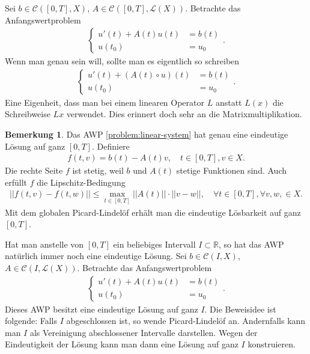 \documentclass[a4paper]{article}
\theoremstyle{definition}
\newtheorem{remark}[theorem]{Bemerkung}
\begin{document}
Sei $b \in \mathcal{C}([0,T], X)$, $A \in \mathcal C([0,T], \mathcal{L}(X))$. Betrachte das Anfangswertproblem
\begin{align}\label{problem:linear-system}
    \begin{cases}
        u'(t) + A(t)u(t) &= b(t) \\
        u(t_0) &= u_0
    \end{cases} \tag{$\star$}.
\end{align}
Wenn man genau sein will, sollte man es eigentlich so schreiben
\begin{align*}
    \begin{cases}
        u'(t) + (A(t) \circ u)(t) &= b(t) \\
        u(t_0) &= u_0
    \end{cases}.
\end{align*}
Eine Eigenheit, dass man bei einem linearen Operator $L$ anstatt $L(x)$ die Schreibweise $Lx$ verwendet. Dies erinnert doch sehr an die Matrixmultiplikation.

\begin{remark}
Das AWP \eqref{problem:linear-system} hat genau eine eindeutige Lösung auf ganz $[0,T]$. Definiere
\begin{align*}
    f(t,v) = b(t) - A(t)v, \quad t \in [0,T], v \in X.
\end{align*}
Die rechte Seite $f$ ist stetig, weil $b$ und $A(t)$ stetige Funktionen sind. Auch erfüllt $f$ die Lipschitz-Bedingung
\begin{align*}
    ||f(t,v) - f(t,w)|| \leq \max_{t \in [0,T]}||A(t)||\cdot||v-w||, \quad \forall t \in [0,T], \forall v,w, \in X.
\end{align*}
Mit dem globalen Picard-Lindelöf erhält man die eindeutige Lösbarkeit auf ganz $[0,T]$.
\end{remark}
Hat man anstelle von $[0,T]$ ein beliebiges Intervall $I \subset \mathbb{R}$, so hat das AWP natürlich immer noch eine eindeutige Lösung.
Sei $b \in \mathcal{C}(I, X)$, $A \in \mathcal C(I, \mathcal{L}(X))$. Betrachte das Anfangswertproblem
\begin{align*}
    \begin{cases}
        u'(t) + A(t)u(t) &= b(t) \\
        u(t_0) &= u_0
    \end{cases}.
\end{align*}
Dieses AWP besitzt eine eindeutige Lösung auf ganz $I$. Die Beweisidee ist folgende: Falls $I$ abgeschlossen ist, so wende Picard-Lindelöf an. Andernfalls kann man $I$ als Vereinigung abschlossener Intervalle darstellen. Wegen der Eindeutigkeit der Lösung kann man dann eine Lösung auf ganz $I$ konstruieren.
\end{document}
